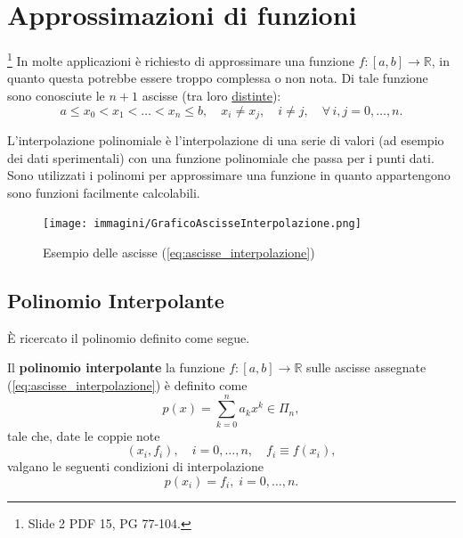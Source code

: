 \section{Approssimazioni di funzioni}
\footnote{Slide 2 PDF 15, PG 77-104.}
In molte applicazioni è richiesto di approssimare una funzione $f:[a,b]\rightarrow\mathbb R$, in quanto questa potrebbe essere troppo complessa o non nota. Di tale funzione sono conosciute le $n+1$ ascisse (tra loro \underline{distinte}):
\begin{equation}\label{eq:ascisse_interpolazione}
	a\leq x_0<x_1<\hdots<x_n\leq b,\quad x_i\neq x_j, \quad i\neq j, \quad \forall\, i,j=0,\hdots,n.
\end{equation}

L'interpolazione polinomiale è l'interpolazione di una serie di valori (ad esempio dei dati sperimentali) con una funzione polinomiale che passa per i punti dati. Sono utilizzati i polinomi per approssimare una funzione in quanto appartengono sono funzioni facilmente calcolabili.

\begin{figure}
	\centering
	\texttt{[image: immagini/GraficoAscisseInterpolazione.png]}
	\caption{\label{fig:GraficoAscisseInterp} Esempio delle ascisse (\ref{eq:ascisse_interpolazione})}
\end{figure}

\subsection{Polinomio Interpolante}
È ricercato il polinomio definito come segue.

\begin{definition}
	Il \textbf{polinomio interpolante} la funzione $f:[a,b]\rightarrow\mathbb{R}$ sulle ascisse assegnate (\ref{eq:ascisse_interpolazione}) è definito come
	\begin{equation}\label{eq:polinomio_interpolante_generico}
		p(x) = \sum_{k=0}^{n}a_kx^k \in\Pi_n,
	\end{equation}
	tale che, date le coppie note
	\begin{equation}\label{eq:coppie_xi,fi}
		(x_i,f_i),\quad i=0,\hdots,n, \quad f_i\equiv f(x_i),
	\end{equation}
	valgano le seguenti condizioni di interpolazione 
	\begin{equation}\label{eq:condizioni_interpolazione}
		p(x_i)=f_i,\; i=0,\hdots,n.
	\end{equation}
\end{definition}

